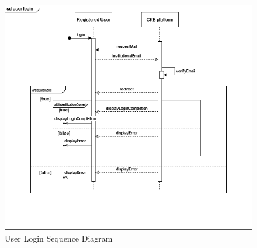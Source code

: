 \begin{center}
    \begin{figure} [H]
        \begin{center}
            \includegraphics[width=0.9\linewidth]{Images/SequenceDiagrams/SD_2.png}
            \caption{User Login Sequence Diagram}
            \label{fig: user_login_seq_diag}
        \end{center}
    \end{figure}
\end{center}

\newpage
